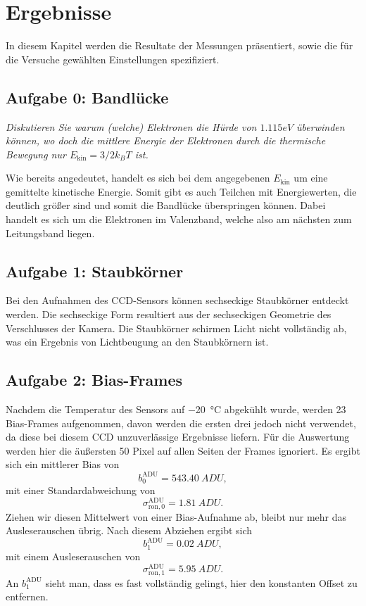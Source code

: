 \section{Ergebnisse}

In diesem Kapitel werden die Resultate der Messungen präsentiert, sowie die für die Versuche gewählten Einstellungen spezifiziert. 
\setcounter{subsection}{-1}

\subsection{Aufgabe 0: Bandlücke}
\textit{Diskutieren Sie warum (welche) Elektronen die Hürde von $1.115 \unit{eV}$ überwinden
	können, wo doch die mittlere Energie der Elektronen durch die thermische Bewegung nur
	$E_\mathrm{kin} = 3/2 k_B T$ ist.}


Wie bereits angedeutet, handelt es sich bei dem angegebenen $E_\mathrm{kin}$ um eine gemittelte kinetische Energie. Somit gibt es auch Teilchen mit Energiewerten, die deutlich größer sind und somit die Bandlücke überspringen können. Dabei handelt es sich um die Elektronen im Valenzband, welche also am nächsten zum Leitungsband liegen. 



\subsection{Aufgabe 1: Staubkörner}

Bei den Aufnahmen des CCD-Sensors können sechseckige Staubkörner entdeckt werden. Die sechseckige Form resultiert aus der sechseckigen Geometrie des Verschlusses der Kamera. Die Staubkörner schirmen Licht nicht vollständig ab, was ein Ergebnis von Lichtbeugung an den Staubkörnern ist. 

\subsection{Aufgabe 2: Bias-Frames}
\label{subsec:ex2}
Nachdem die Temperatur des Sensors auf \SI{-20}{\degreeCelsius} abgekühlt wurde, werden 23 Bias-Frames aufgenommen, davon werden die ersten drei jedoch nicht verwendet, da diese bei diesem CCD unzuverlässige Ergebnisse liefern. Für die Auswertung werden hier die äußersten 50 Pixel auf allen Seiten der Frames ignoriert. Es ergibt sich ein mittlerer Bias von $$b^{\mathrm{ADU}}_{0}=\SI{543.40}{ADU}, $$
mit einer Standardabweichung von $$\sigma_{\mathrm{ron, 0}}^{\mathrm{ADU}}=\SI{1.81}{ADU}. $$
Ziehen wir diesen Mittelwert von einer Bias-Aufnahme ab, bleibt nur mehr das Ausleserauschen übrig. Nach diesem Abziehen ergibt sich
$$b^{\mathrm{ADU}}_{1}=\SI{0.02}{ADU}, $$
mit einem Ausleserauschen von $$\sigma_{\mathrm{ron, 1}}^{\mathrm{ADU}}=\SI{5.95}{ADU}. $$
An $b^{\mathrm{ADU}}_{1}$ sieht man, dass es fast vollständig gelingt, hier den konstanten Offset zu entfernen. 

